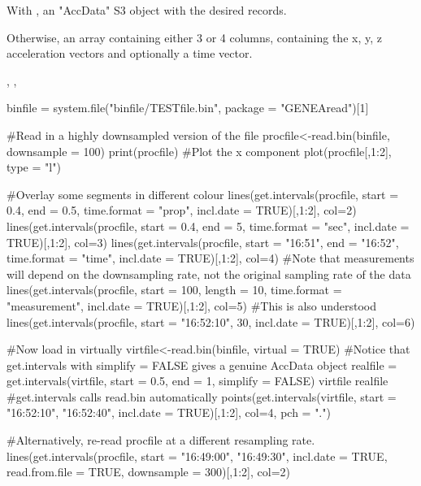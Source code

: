 \documentclass[a4paper]{book}
\begin{document}
%
\begin{Value}
With , an "AccData" S3 object with the desired records.

Otherwise, an array containing either 3 or 4 columns, containing the x, y, z acceleration vectors and optionally a time vector.
\end{Value}
%
\begin{SeeAlso}\relax
{}, \code{\LinkA{[.AccData}{[.AccData}}, 
\end{SeeAlso}
%
\begin{Examples}
\begin{ExampleCode}

binfile  = system.file("binfile/TESTfile.bin", package = "GENEAread")[1]

#Read in a highly downsampled version of the file
procfile<-read.bin(binfile, downsample = 100)
print(procfile)
#Plot the x component
plot(procfile[,1:2], type = "l")

#Overlay some segments in different colour
lines(get.intervals(procfile, start = 0.4, end = 0.5, time.format = "prop", incl.date = TRUE)[,1:2], col=2) 
lines(get.intervals(procfile, start = 0.4, end = 5, time.format = "sec", incl.date = TRUE)[,1:2], col=3) 
lines(get.intervals(procfile, start = "16:51", end = "16:52", time.format = "time", incl.date = TRUE)[,1:2], col=4) 
#Note that measurements will depend on the downsampling rate, not the original sampling rate of the data
lines(get.intervals(procfile, start = 100, length = 10, time.format = "measurement", incl.date = TRUE)[,1:2], col=5) 
#This is also understood
lines(get.intervals(procfile, start = "16:52:10", 30,  incl.date = TRUE)[,1:2], col=6) 

#Now load in virtually
virtfile<-read.bin(binfile, virtual = TRUE)
#Notice that get.intervals with simplify = FALSE gives a genuine AccData object
realfile = get.intervals(virtfile, start = 0.5, end = 1, simplify = FALSE)
virtfile
realfile
#get.intervals calls read.bin automatically
points(get.intervals(virtfile, start = "16:52:10", "16:52:40",  incl.date = TRUE)[,1:2], col=4, pch = ".") 

#Alternatively, re-read procfile at a different resampling rate.
lines(get.intervals(procfile, start = "16:49:00", "16:49:30",  incl.date = TRUE, read.from.file = TRUE, downsample = 300)[,1:2], col=2) 


\end{ExampleCode}
\end{Examples}
\end{document}
